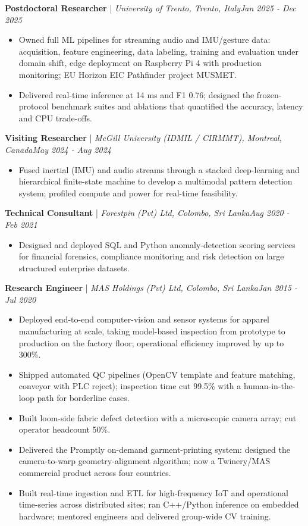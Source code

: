 \documentclass[11pt]{article}
\newenvironment{cvrole}[5]{%
  \par\noindent\textbf{\large #1} | \textit{\small #2, #3}\hfill \textit{\small #4 - #5}\par
  \begin{itemize}[leftmargin=2em, itemsep=-0.3em, topsep=-0.5em]%
}{%
  \end{itemize}\par\noindent\mbox{}\par\vspace{0.1em}%
}
\begin{document}
\newpage
\begin{cvrole}{Postdoctoral Researcher}{University of Trento}{Trento, Italy}{Jan 2025}{Dec 2025}
    \item Owned full ML pipelines for streaming audio and IMU/gesture data: acquisition, feature engineering, data labeling, training and evaluation under domain shift, edge deployment on Raspberry Pi 4 with production monitoring; EU Horizon EIC Pathfinder project MUSMET.
    \item Delivered real-time inference at 14 ms and F1 0.76; designed the frozen-protocol benchmark suites and ablations that quantified the accuracy, latency and CPU trade-offs.
\end{cvrole}

\begin{cvrole}{Visiting Researcher}{McGill University (IDMIL / CIRMMT)}{Montreal, Canada}{May 2024}{Aug 2024}
    \item Fused inertial (IMU) and audio streams through a stacked deep-learning and hierarchical finite-state machine to develop a multimodal pattern detection system; profiled compute and power for real-time feasibility.
\end{cvrole}

\begin{cvrole}{Technical Consultant}{Forestpin (Pvt) Ltd}{Colombo, Sri Lanka}{Aug 2020}{Feb 2021}
    \item Designed and deployed SQL and Python anomaly-detection scoring services for financial forensics, compliance monitoring and risk detection on large structured enterprise datasets.
\end{cvrole}


\begin{cvrole}{Research Engineer}{MAS Holdings (Pvt) Ltd}{Colombo, Sri Lanka}{Jan 2015}{Jul 2020}
    \item Deployed end-to-end computer-vision and sensor systems for apparel manufacturing at scale, taking model-based inspection from prototype to production on the factory floor; operational efficiency improved by up to 300\%.
    \item Shipped automated QC pipelines (OpenCV template and feature matching, conveyor with PLC reject); inspection time cut 99.5\% with a human-in-the-loop path for borderline cases.
    \item Built loom-side fabric defect detection with a microscopic camera array; cut operator headcount 50\%.
    \item Delivered the Promptly on-demand garment-printing system: designed the camera-to-warp geometry-alignment algorithm; now a Twinery/MAS commercial product across four countries.
    \item Built real-time ingestion and ETL for high-frequency IoT and operational time-series across distributed sites; ran C++/Python inference on embedded hardware; mentored engineers and delivered group-wide CV training.
\end{cvrole}
\end{document}
